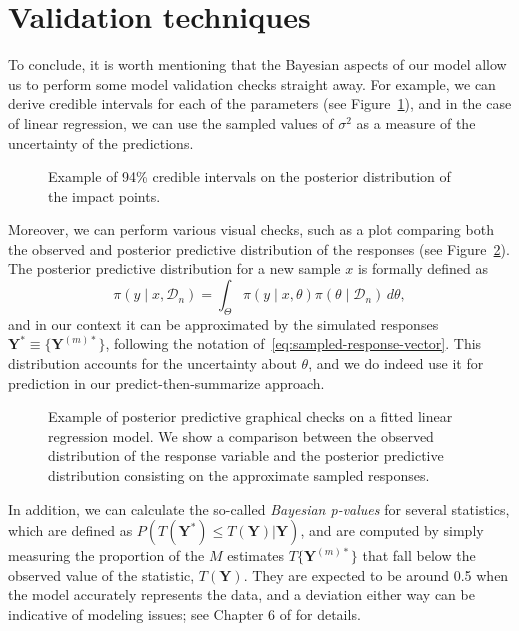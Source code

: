 \section{Validation techniques}

To conclude, it is worth mentioning that the Bayesian aspects of our model allow us to perform some model validation checks straight away. For example, we can derive credible intervals for each of the parameters (see Figure~\ref{fig:credible_intervals}), and in the case of linear regression, we can use the sampled values of \(\sigma^2\) as a measure of the uncertainty of the predictions.

\begin{figure}[ht!]
  \centering
    \setlength{\fboxrule}{.5pt}%
  \caption{Example of 94\% credible intervals on the posterior distribution of the impact points.}\label{fig:credible_intervals}
\end{figure}


Moreover, we can perform various visual checks, such as a plot comparing both the observed and posterior predictive distribution of the responses (see Figure~\ref{fig:ppc}). The posterior predictive distribution for a new sample \(x\) is formally defined as
\[
\pi(y\mid x, \mathcal D_n) = \int_{\Theta} \pi(y\mid x, \theta)\pi(\theta\mid \mathcal D_n)\, d\theta,
\]
and in our context it can be approximated by the simulated responses \(\symbf Y^* \equiv \{\symbf Y^{(m)*}\}\), following the notation of~\eqref{eq:sampled-response-vector}. This distribution accounts for the uncertainty about \(\theta\), and we do indeed use it for prediction in our predict-then-summarize approach.

\begin{figure}[ht!]
  \centering
  \setlength{\fboxrule}{.5pt}%
  \caption{Example of posterior predictive graphical checks on a fitted linear regression model. We show a comparison between the observed distribution of the response variable and the posterior predictive distribution consisting on the approximate sampled responses.}\label{fig:ppc}
\end{figure}


In addition, we can calculate the so-called \textit{Bayesian p-values} for several statistics, which are defined as \(P(T(\symbf Y^*)\leq T(\symbf Y)| \symbf Y)\), and are computed by simply measuring the proportion of the \(M\) estimates \(T\{\symbf Y^{(m)*}\}\) that fall below the observed value of the statistic, \(T(\symbf{Y})\). They are expected to be around 0.5 when the model accurately represents the data, and a deviation either way can be indicative of modeling issues; see Chapter 6 of \citet{gelman2013bayesian} for details.
